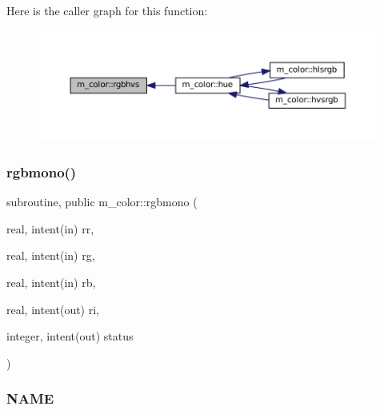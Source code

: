 \begin{DoxyDescription}
\begin{DoxyPre}
\begin{DoxyPre} \end{DoxyPre}
\end{DoxyPre}



\begin{DoxyPre}
\begin{DoxyPre} \end{DoxyPre}
\end{DoxyPre}

\end{DoxyDescription}Here is the caller graph for this function\+:\nopagebreak
\begin{figure}[H]
\begin{center}
\leavevmode
\includegraphics[width=350pt]{namespacem__color_a76f00e1d418c4904a963094bc730a0e6_icgraph}
\end{center}
\end{figure}
\mbox{\label{namespacem__color_aca19999686fc20d79da580c6a643dc35}} 
\subsubsection{\texorpdfstring{rgbmono()}{rgbmono()}}
{\footnotesize\ttfamily subroutine, public m\+\_\+color\+::rgbmono (\begin{DoxyParamCaption}\item[{real, intent(in)}]{rr,  }\item[{real, intent(in)}]{rg,  }\item[{real, intent(in)}]{rb,  }\item[{real, intent(out)}]{ri,  }\item[{integer, intent(out)}]{status }\end{DoxyParamCaption})}



\subsubsection*{N\+A\+ME}

